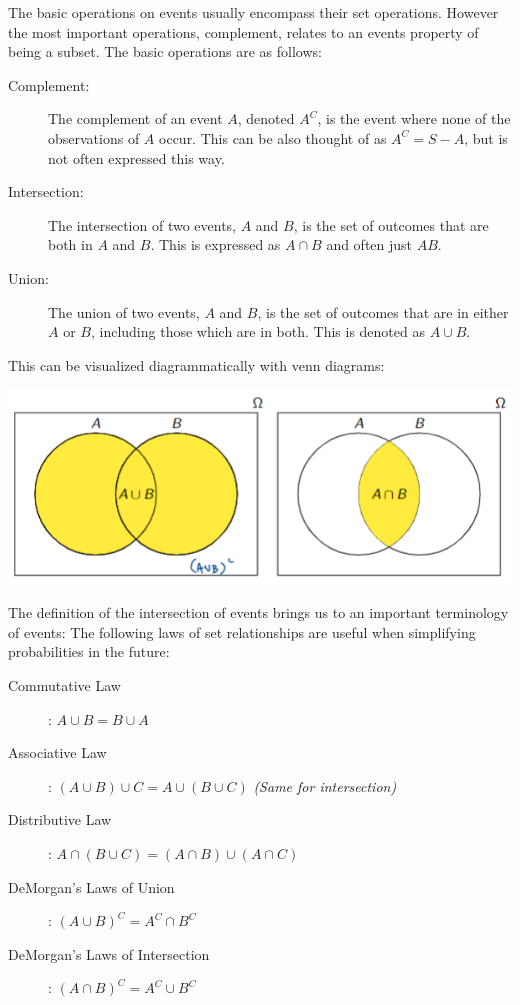 \documentclass{report}
\begin{document}
        The basic operations on events usually encompass their set operations. However the most important operations, complement, relates to an events property of being a subset. The basic operations are as follows:
        \begin{description}
            \item[Complement:] The complement of an event $A$, denoted $A^C$, is the event where none of the observations of $A$ occur. This can be also thought of as $A^C=S-A$, but is not often expressed this way.
            \item[Intersection:]  The intersection of two events, $A$ and $B$, is the set of outcomes that are both in $A$ and $B$. This is expressed as $A\cap B$ and often just $AB$. 
            \item[Union: ] The union of two events, $A$ and $B$, is the set of outcomes that are in either $A$ or $B$, including those which are in both. This is denoted as $A\cup B$.
        \end{description}
        This can be visualized diagrammatically with venn diagrams:

        \includegraphics[scale=1]{2022-12-15-18-03-07.png}

        The definition of the intersection of events brings us to an important terminology of events:
        The following laws of set relationships are useful when simplifying probabilities in the future:
        \begin{description}
            \item [Commutative Law]: $A \cup B = B \cup A$
            \item [Associative Law]: $ (A \cup B) \cup C = A \cup (B \cup C)$ \textit{(Same for intersection)}
            \item [Distributive Law]: $A \cap (B \cup C) = (A \cap B) \cup (A \cap C)$
            \item [DeMorgan's Laws of Union]: $(A\cup B)^C = A^C \cap B^C$
            \item [DeMorgan's Laws of Intersection]: $(A \cap B)^C = A^C \cup B^C$
        \end{description}
\end{document}
